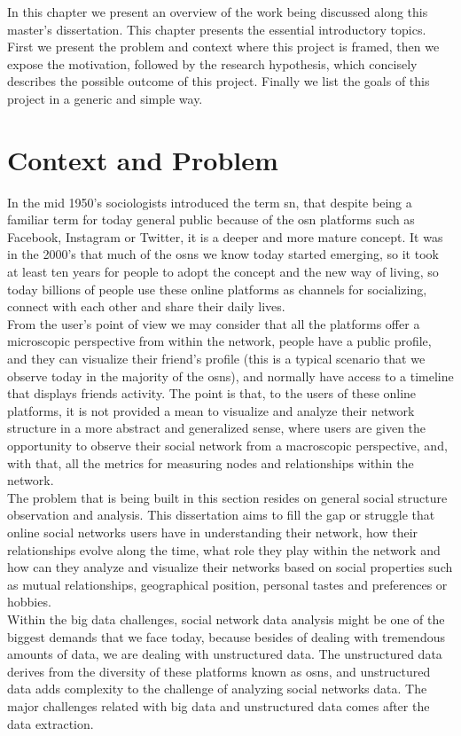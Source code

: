 In this chapter we present an overview of the work being discussed along this master's dissertation. This chapter presents the essential introductory topics. First we present the problem and context where this project is framed, then we expose the motivation, followed by the research hypothesis, which concisely describes the possible outcome of this project. Finally we list the goals of this project in a generic and simple way.

\section{Context and Problem}

In the mid 1950's sociologists introduced the term \acrfull{sn}, that despite being a familiar term for today general public because of the \acrfull{osn} platforms such as Facebook, Instagram or Twitter, it is a deeper and more mature concept. It was in the 2000's that much of the \glspl{osn} we know today started emerging, so it took at least ten years for people to adopt the concept and the new way of living, so today billions of people use these online platforms as channels for socializing, connect with each other and share their daily lives.\\
\indent From the user's point of view we may consider that all the platforms offer a microscopic perspective from within the network, people have a public profile, and they can visualize their friend's profile (this is a typical scenario that we observe today in the majority of the \glspl{osn}), and normally have access to a timeline that displays friends activity. The point is that, to the users of these online platforms, it is not provided a mean to visualize and analyze their network structure in a more abstract and generalized sense, where users are given the opportunity to observe their social network from a macroscopic perspective, and, with that, all the metrics for measuring nodes and relationships within the network.\\
\indent The problem that is being built in this section resides on general social structure observation and analysis. This dissertation aims to fill the gap or struggle that online social networks users have in understanding their network, how their relationships evolve along the time, what role they play within the network and how can they analyze and visualize their networks based on social properties such as mutual relationships, geographical position, personal tastes and preferences or hobbies.\\
\indent Within the big data challenges, social network data analysis might be one of the biggest demands that we face today, because besides of dealing with tremendous amounts of data, we are dealing with unstructured data. The unstructured data derives from the diversity of these platforms known as \glspl{osn}, and unstructured data adds complexity to the challenge of analyzing social networks data. The major challenges related with big data and unstructured data comes after the data extraction.

